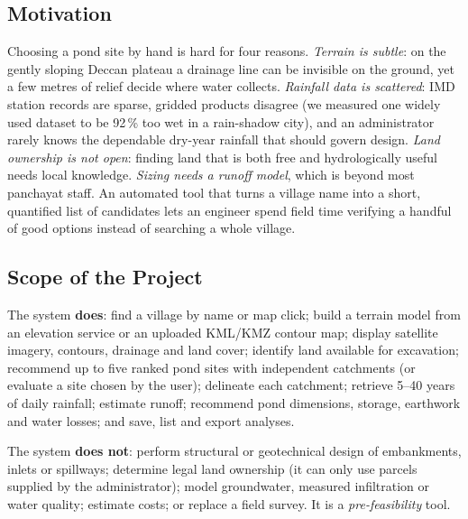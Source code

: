 \documentclass[manuscript,screen,review]{acmart}
\begin{document}
\subsection{Motivation}
Choosing a pond site by hand is hard for four reasons. \emph{Terrain is subtle}: on the gently
sloping Deccan plateau a drainage line can be invisible on the ground, yet a few metres of
relief decide where water collects. \emph{Rainfall data is scattered}: IMD station records are
sparse, gridded products disagree (we measured one widely used dataset to be 92\,\% too wet in
a rain-shadow city), and an administrator rarely knows the dependable dry-year rainfall that
should govern design. \emph{Land ownership is not open}: finding land that is both free and
hydrologically useful needs local knowledge. \emph{Sizing needs a runoff model}, which is
beyond most panchayat staff. An automated tool that turns a village name into a short,
quantified list of candidates lets an engineer spend field time verifying a handful of good
options instead of searching a whole village.

\subsection{Scope of the Project}
The system \textbf{does}: find a village by name or map click; build a terrain model from an
elevation service or an uploaded KML/KMZ contour map; display satellite imagery, contours,
drainage and land cover; identify land available for excavation; recommend up to five ranked
pond sites with independent catchments (or evaluate a site chosen by the user); delineate each
catchment; retrieve 5--40 years of daily rainfall; estimate runoff; recommend pond dimensions,
storage, earthwork and water losses; and save, list and export analyses.

The system \textbf{does not}: perform structural or geotechnical design of embankments,
inlets or spillways; determine legal land ownership (it can only use parcels supplied by the
administrator); model groundwater, measured infiltration or water quality; estimate costs; or
replace a field survey. It is a \emph{pre-feasibility} tool.
\end{document}
